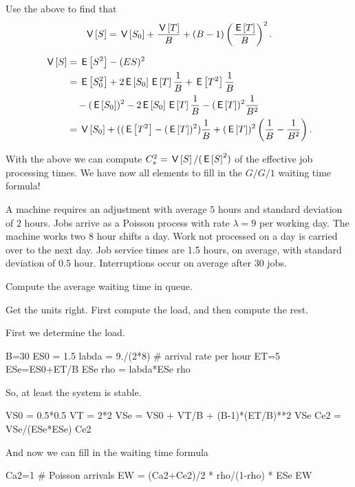 \begin{exercise}
  Use the above to find that
  \begin{equation*}
    \,\mathsf{V}\left[S\right] = \,\mathsf{V}\left[S_0\right] + \frac{\,\mathsf{V}\left[T\right]} B + (B-1)\left(\frac{\,\mathsf{E}\left[T\right]}{B}\right)^2.
  \end{equation*}
  \begin{solution}
    \begin{equation*}
      \begin{split}
\,\mathsf{V}\left[S\right] 
&=\,\mathsf{E}\left[S^2\right] - (E{S})^2 \\
&= \,\mathsf{E}\left[S_0^2\right] + 2 \,\mathsf{E}\left[S_0\right] \,\mathsf{E}\left[T\right]\frac 1B + \,\mathsf{E}\left[T^2\right]\frac 1B  \\
&\quad - (\,\mathsf{E}\left[S_0\right])^2 - 2\,\mathsf{E}\left[S_0\right]\,\mathsf{E}\left[T\right] \frac 1 B - (\,\mathsf{E}\left[T\right])^2\frac1{B^2}\\
&=  \,\mathsf{V}\left[S_0\right] + ((\,\mathsf{E}\left[T^2\right] - (\,\mathsf{E}\left[T\right])^2)\frac 1 B + (\,\mathsf{E}\left[T\right])^2\left(\frac 1B - \frac 1{B^2}\right).
      \end{split}
    \end{equation*}
  \end{solution}
\end{exercise}

With the above we can compute $C_s^2=\,\mathsf{V}\left[S\right]/(\,\mathsf{E}\left[S\right]^2)$ of the effective job processing times. We have now all elements to fill in the $G/G/1$ waiting time formula!

\begin{exercise}
A machine requires an adjustment with average $5$ hours and standard deviation of $2$ hours. Jobs arrive as a Poisson process with rate $\lambda=9$ per working day. The machine works two $8$ hour shifts a day. Work not processed on a day is carried over to the next day. Job service times are 1.5 hours, on average, with standard deviation of $0.5$ hour. Interruptions occur on average after $30$ jobs.

Compute the average waiting time in queue.
\begin{hint}
  Get the units right. First compute the load, and then compute the rest.
\end{hint}
\begin{solution}
  First we determine the load. 
  \begin{pyconsole}
B=30
ES0 = 1.5
labda = 9./(2*8) # arrival rate per hour
ET=5
ESe=ES0+ET/B
ESe
rho = labda*ESe
rho
  \end{pyconsole}
So, at least the system is stable.

\begin{pyconsole}
VS0 = 0.5*0.5
VT = 2*2
VSe = VS0 + VT/B + (B-1)*(ET/B)**2
VSe
Ce2 = VSe/(ESe*ESe)
Ce2
\end{pyconsole}

And now we can fill in the waiting time formula
\begin{pyconsole}
Ca2=1 # Poisson arrivals
EW = (Ca2+Ce2)/2 * rho/(1-rho) * ESe
EW  
\end{pyconsole}
\end{solution}
\end{exercise}

